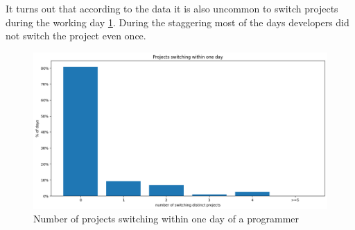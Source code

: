 It turns out that according to the data it is also uncommon to switch projects during the working day \ref{fig:projects_switching_per_day}. During the staggering most of the days developers did not switch the project even once.

\begin{figure}[htbp]
  \centering
  \includegraphics[scale=0.5]{chapters/results/graphics/projects-switching-day.png}
  \caption{Number of projects switching within one day of a programmer}
  \label{fig:projects_switching_per_day}
\end{figure}
